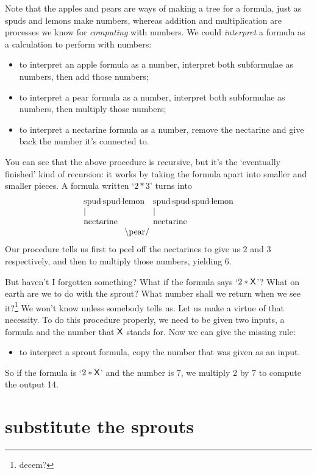 \documentclass{book}
\begin{document}
Note that the apples and pears are ways of making a tree for a formula, just as spuds and lemons make numbers, whereas addition and multiplication are processes we know for \emph{computing} with numbers. We could \emph{interpret} a formula as a calculation to perform with numbers:
\begin{itemize}
\item to interpret an apple formula as a number, interpret both subformulae as numbers, then add those numbers;
\item to interpret a pear formula as a number, interpret both subformulae as numbers, then multiply those numbers;
\item to interpret a nectarine formula as a number, remove the nectarine and give back the number it's connected to.
\end{itemize}
You can see that the above procedure is recursive, but it's the `eventually finished' kind of recursion: it works by taking the formula apart into smaller and smaller pieces. A formula written `$2*3$' turns into
\[\begin{array}{l@{\quad}l}
\spud\spud\lemon & \spud\spud\spud\lemon \\
| & | \\
\mbox{nectarine} & \mbox{nectarine} \\
\multicolumn{2}{c}{\backslash\mbox{pear}/\hspace*{0.7in}}
\end{array}\]
Our procedure tells us first to peel off the nectarines to give us $2$ and $3$ respectively, and then to multiply those numbers, yielding 6.

But haven't I forgotten something? What if the formula says `$2*\mathsf{X}$'? What on earth are we to do with the sprout? What number shall we return when we see it?\footnote{decem?} We won't know unless somebody tells us. Let us make a virtue of that necessity. To do this procedure properly, we need to be given two inputs, a formula and the number that $\mathsf{X}$ stands for. Now we can give the missing rule:
\begin{itemize}
\item to interpret a sprout formula, copy the number that was given as an input.
\end{itemize}

So if the formula is `$2*\mathsf{X}$' and the number is 7, we multiply 2 by 7 to compute the output 14.


\section{substitute the sprouts}
\end{document}
